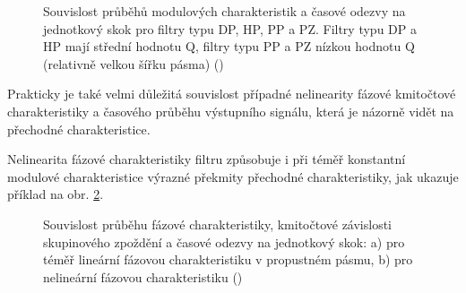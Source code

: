         \begin{figure}[ht!]
          \centering  
             \newline
             \newline
             \newline
          \caption{Souvislost průběhů modulových charakteristik a časové odezvy na jednotkový skok
                  pro filtry typu DP, HP, PP a PZ. Filtry typu DP a HP mají střední hodnotu Q,
                  filtry typu PP a PZ nízkou hodnotu Q (relativně velkou šířku pásma)
                  (\cite[s.~32]{HajekSedlacek2002})}
                  \label{aes:fig032}
        \end{figure}

        Prakticky je také velmi důležitá souvislost případné nelinearity fázové kmitočtové
        charakteristiky a časového průběhu výstupního signálu, která je názorně vidět na přechodné
        charakteristice. 
        
        Nelinearita fázové charakteristiky filtru způsobuje i při téměř konstantní modulové
        charakteristice výrazné překmity přechodné charakteristiky, jak ukazuje příklad na obr.
        \ref{aes:fig033}. 

        \begin{figure}[ht!]
          \centering  
                \newline
          \caption{Souvislost průběhu fázové charakteristiky, kmitočtové závislosti skupinového
                  zpoždění a časové odezvy na jednotkový skok: a) pro téměř lineární fázovou
                  charakteristiku v propustném pásmu, b) pro nelineární fázovou charakteristiku
                  (\cite[s.~33]{HajekSedlacek2002})}
                  \label{aes:fig033}
        \end{figure}

